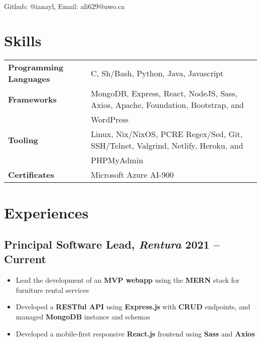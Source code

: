 \documentclass{article}
\author{Ian Li}
\makeatletter
\renewcommand{\maketitle}{
		\vspace{-4em}
		{\huge\bfseries
		\theauthor}
    \vspace{0.2em}
    \\
    Github: @ianayl, Email: ali629@uwo.ca
}
\makeatother
\begin{document}
\maketitle


\section{Skills}

\begin{tabular}{ l l }
    \textbf{Programming Languages} & C, Sh/Bash, Python, Java, Javascript \\
    \textbf{Frameworks} & MongoDB, Express, React, NodeJS, Sass, Axios, Apache, Foundation, Bootstrap, and \\
    & WordPress \\
    \textbf{Tooling} & Linux, Nix/NixOS, PCRE Regex/Sed, Git, SSH/Telnet, Valgrind, Netlify, Heroku, and \\
    & PHPMyAdmin\\
    \textbf{Certificates} & Microsoft Azure AI-900
\end{tabular}

\section*{Experiences}

\subsection{Principal Software Lead, \textit{Rentura} \hfill \normalsize\textnormal{2021 -- Current}}
\begin{itemize}
    \item Lead the development of an \textbf{MVP webapp} using the \textbf{MERN} stack for furniture rental services
    \item Developed a \textbf{RESTful API} using \textbf{Express.js} with \textbf{CRUD} endpoints, and managed \textbf{MongoDB} instance and schemas 
    \item Developed a mobile-first responsive \textbf{React.js} frontend using \textbf{Sass} and \textbf{Axios}
\end{itemize}
\end{document}
